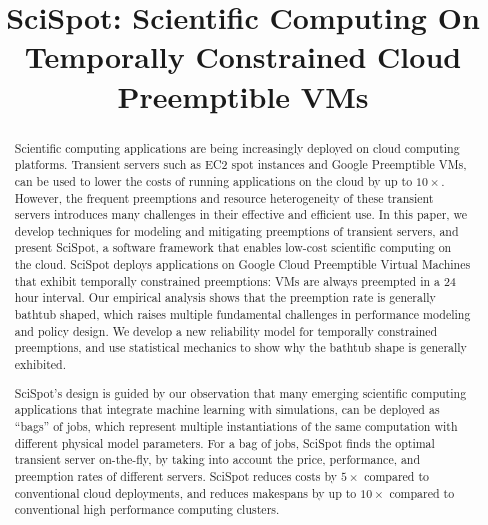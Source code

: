 \documentclass[compsoc]{IEEEtran}
\begin{document}
\title{SciSpot: Scientific Computing On Temporally Constrained Cloud Preemptible VMs}


\author{
  
}
\maketitle 


\begin{abstract}
  Scientific computing applications are being increasingly deployed on cloud computing platforms.
Transient servers such as EC2 spot instances and Google Preemptible VMs, can be used to lower the costs of running applications on the cloud by up to $10\times$. 
However, the frequent preemptions and resource heterogeneity of these transient servers introduces many challenges in their effective and efficient use. 
In this paper, we develop techniques for modeling and mitigating preemptions of transient servers, and present SciSpot, a software framework that enables low-cost scientific computing on the cloud. 
SciSpot deploys applications on Google Cloud Preemptible Virtual Machines that exhibit temporally constrained preemptions: VMs are always preempted in a 24 hour interval. 
Our empirical analysis shows that the preemption rate is generally  bathtub shaped, which raises multiple fundamental challenges in performance modeling and policy design. 
We develop a new reliability model for temporally constrained preemptions, and use statistical mechanics to show why the bathtub shape is generally exhibited. 


SciSpot's design is guided by our observation that many emerging scientific computing applications that integrate machine learning with simulations, can be deployed as ``bags'' of jobs, which represent multiple instantiations of the same computation with different physical model parameters. 
For a bag of jobs, SciSpot finds the optimal transient server on-the-fly, by taking into account the price, performance, and preemption rates of different servers. 
SciSpot reduces costs by $5\times$ compared to conventional cloud deployments, and reduces  makespans by up to $10\times$ compared to conventional high performance computing clusters.
























 \end{abstract}
\end{document}

